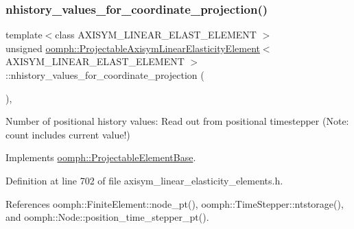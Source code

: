 \subsubsection{\texorpdfstring{nhistory\+\_\+values\+\_\+for\+\_\+coordinate\+\_\+projection()}{nhistory\_values\_for\_coordinate\_projection()}}
{\footnotesize\ttfamily template$<$class A\+X\+I\+S\+Y\+M\+\_\+\+L\+I\+N\+E\+A\+R\+\_\+\+E\+L\+A\+S\+T\+\_\+\+E\+L\+E\+M\+E\+NT $>$ \\
unsigned \hyperlink{classoomph_1_1ProjectableAxisymLinearElasticityElement}{oomph\+::\+Projectable\+Axisym\+Linear\+Elasticity\+Element}$<$ A\+X\+I\+S\+Y\+M\+\_\+\+L\+I\+N\+E\+A\+R\+\_\+\+E\+L\+A\+S\+T\+\_\+\+E\+L\+E\+M\+E\+NT $>$\+::nhistory\+\_\+values\+\_\+for\+\_\+coordinate\+\_\+projection (\begin{DoxyParamCaption}{ }\end{DoxyParamCaption})\hspace{0.3cm}{\ttfamily [inline]}, {\ttfamily [virtual]}}



Number of positional history values\+: Read out from positional timestepper (Note\+: count includes current value!) 



Implements \hyperlink{classoomph_1_1ProjectableElementBase_ab4ecd0cd24000a3ed675dc7198203c1f}{oomph\+::\+Projectable\+Element\+Base}.



Definition at line 702 of file axisym\+\_\+linear\+\_\+elasticity\+\_\+elements.\+h.



References oomph\+::\+Finite\+Element\+::node\+\_\+pt(), oomph\+::\+Time\+Stepper\+::ntstorage(), and oomph\+::\+Node\+::position\+\_\+time\+\_\+stepper\+\_\+pt().

\mbox{\label{classoomph_1_1ProjectableAxisymLinearElasticityElement_ac728e9dd1f32500ecabd559f4f457fd6}} 
